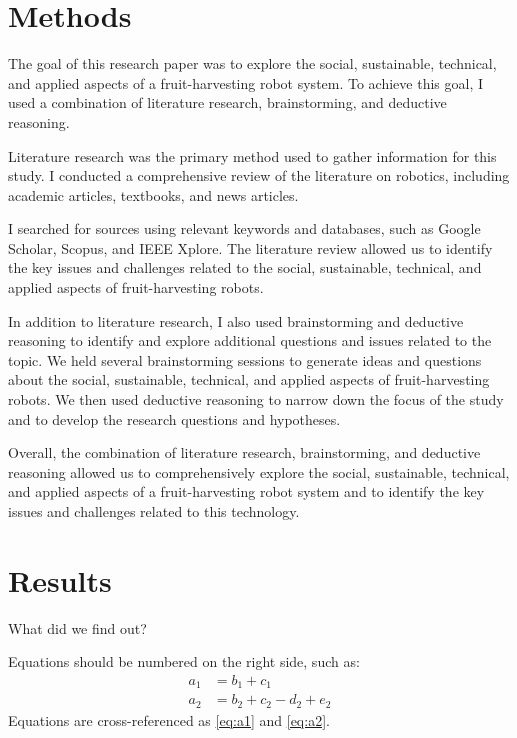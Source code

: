 \documentclass{modelica}
\begin{document}
\subsection{}

\section{Methods}
The goal of this research paper was to explore the social, sustainable, technical, and applied aspects of a fruit-harvesting robot system. To achieve this goal, I used a combination of literature research, brainstorming, and deductive reasoning.

Literature research was the primary method used to gather information for this study. I conducted a comprehensive review of the literature on robotics, including academic articles, textbooks, and news articles. 


I searched for sources using relevant keywords and databases, such as Google Scholar, Scopus, and IEEE Xplore. The literature review allowed us to identify the key issues and challenges related to the social, sustainable, technical, and applied aspects of fruit-harvesting robots.

In addition to literature research, I also used brainstorming and deductive reasoning to identify and explore additional questions and issues related to the topic. We held several brainstorming sessions to generate ideas and questions about the social, sustainable, technical, and applied aspects of fruit-harvesting robots. We then used deductive reasoning to narrow down the focus of the study and to develop the research questions and hypotheses.

Overall, the combination of literature research, brainstorming, and deductive reasoning allowed us to comprehensively explore the social, sustainable, technical, and applied aspects of a fruit-harvesting robot system and to identify the key issues and challenges related to this technology.


\section{Results}
What did we find out?


Equations should be numbered on the right side, such as:
\begin{align}
a_1& =b_1+c_1 \label{eq:a1} \\
a_2& =b_2+c_2-d_2+e_2 \label{eq:a2}
\end{align}
Equations are cross-referenced as \autoref{eq:a1} and \autoref{eq:a2}.
\end{document}
